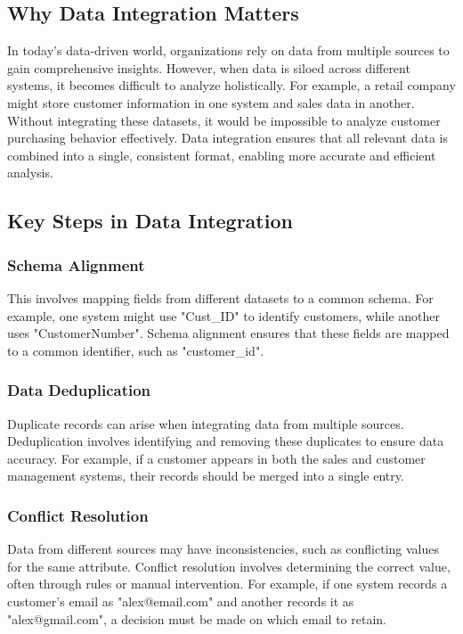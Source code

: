 \documentclass[12pt]{article}
\begin{document}
\subsection{Why Data Integration Matters}

In today’s data-driven world, organizations rely on data from multiple sources to gain comprehensive insights. However, when data is siloed across different systems, it becomes difficult to analyze holistically. For example, a retail company might store customer information in one system and sales data in another. Without integrating these datasets, it would be impossible to analyze customer purchasing behavior effectively. Data integration ensures that all relevant data is combined into a single, consistent format, enabling more accurate and efficient analysis.

\subsection{Key Steps in Data Integration}

\subsubsection{Schema Alignment}
This involves mapping fields from different datasets to a common schema. For example, one system might use "Cust\_ID" to identify customers, while another uses "CustomerNumber". Schema alignment ensures that these fields are mapped to a common identifier, such as "customer\_id".

\subsubsection{Data Deduplication}
Duplicate records can arise when integrating data from multiple sources. Deduplication involves identifying and removing these duplicates to ensure data accuracy. For example, if a customer appears in both the sales and customer management systems, their records should be merged into a single entry.

\subsubsection{Conflict Resolution}
Data from different sources may have inconsistencies, such as conflicting values for the same attribute. Conflict resolution involves determining the correct value, often through rules or manual intervention. For example, if one system records a customer’s email as "alex@email.com" and another records it as "alex@gmail.com", a decision must be made on which email to retain.
\end{document}
